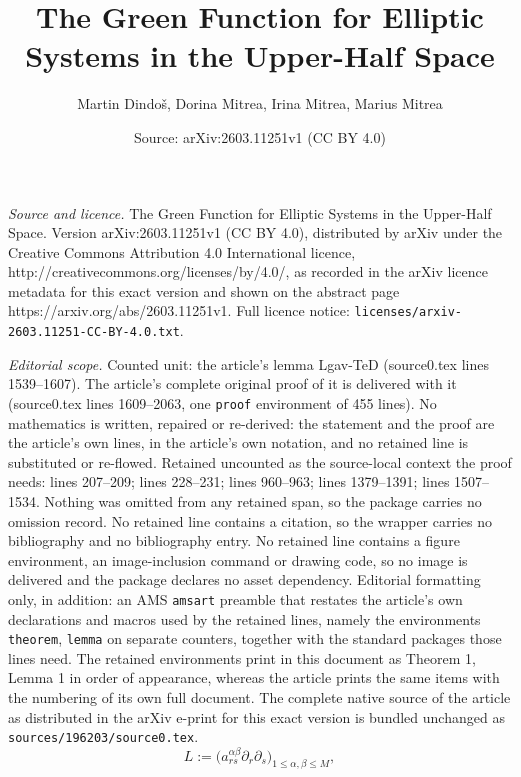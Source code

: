 \documentclass[10pt,a4paper]{amsart}
\title{The Green Function for Elliptic Systems in the Upper-Half Space}
\author{Martin Dindo\v{s}, Dorina Mitrea, Irina Mitrea, Marius Mitrea}
\date{Source: arXiv:2603.11251v1 (CC BY 4.0)}
\begin{document}
\maketitle

\noindent\emph{Source and licence.} The Green Function for Elliptic Systems in the Upper-Half Space. Version arXiv:2603.11251v1 (CC BY 4.0), distributed by arXiv under the Creative Commons Attribution 4.0 International licence, http://creativecommons.org/licenses/by/4.0/, as recorded in the arXiv licence metadata for this exact version and shown on the abstract page https://arxiv.org/abs/2603.11251v1. Full licence notice: \texttt{licenses/arxiv-2603.11251-CC-BY-4.0.txt}.\par\smallskip

\noindent\textit{Editorial scope.} Counted unit: the article's lemma Lgav-TeD (source0.tex lines 1539--1607). The article's complete original proof of it is delivered with it (source0.tex lines 1609--2063, one \texttt{proof} environment of 455 lines). No mathematics is written, repaired or re-derived: the statement and the proof are the article's own lines, in the article's own notation, and no retained line is substituted or re-flowed.  Retained uncounted as the source-local context the proof needs: lines 207--209; lines 228--231; lines 960--963; lines 1379--1391; lines 1507--1534.  Nothing was omitted from any retained span, so the package carries no omission record.  No retained line contains a citation, so the wrapper carries no bibliography and no bibliography entry.  No retained line contains a figure environment, an image-inclusion command or drawing code, so no image is delivered and the package declares no asset dependency.  Editorial formatting only, in addition: an AMS \texttt{amsart} preamble that restates the article's own declarations and macros used by the retained lines, namely the environments \texttt{theorem}, \texttt{lemma} on separate counters, together with the standard packages those lines need.  The retained environments print in this document as Theorem 1, Lemma 1 in order of appearance, whereas the article prints the same items with the numbering of its own full document.  The complete native source of the article as distributed in the arXiv e-print for this exact version is bundled unchanged as \texttt{sources/196203/source0.tex}.
\begin{equation}\label{L-def}
L:=\Big(a^{\alpha\beta}_{rs}\partial_r\partial_s\Big)_{1\leq\alpha,\beta\leq M},
\end{equation}
\end{document}
